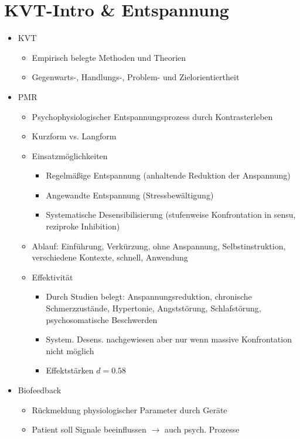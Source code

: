 \documentclass[11pt, paper=a4, twocolumn]{scrartcl}
\begin{document}
	\section{KVT-Intro \& Entspannung}
		\begin{itemize}
			\item KVT
				\begin{itemize}
					\item Empirisch belegte Methoden und Theorien
					\item Gegenwarts-, Handlungs-, Problem- und Zielorientiertheit
				\end{itemize}
			\item PMR
				\begin{itemize}
					\item Psychophysiologischer Entspannungsprozess durch Kontrasterleben
					\item Kurzform vs. Langform
					\item Einsatzmöglichkeiten
						\begin{itemize}
							\item Regelmäßige Entspannung (anhaltende Reduktion der Anspannung)
							\item Angewandte Entspannung (Stressbewältigung)
							\item Systematische Desensibilisierung (stufenweise Konfrontation in sensu, reziproke Inhibition)
						\end{itemize}
					\item Ablauf: Einführung, Verkürzung, ohne Anspannung, Selbstinstruktion, verschiedene Kontexte, schnell, 
						Anwendung
					\item Effektivität
						\begin{itemize}
							\item Durch Studien belegt: Anspannungsreduktion, chronische Schmerzzustände, Hypertonie, 
								Angststörung, Schlafstörung, psychosomatische Beschwerden
							\item System. Desens. nachgewiesen aber nur wenn massive Konfrontation nicht möglich
							\item Effektstärken $d=0.58$
						\end{itemize}
				\end{itemize}
			\item Biofeedback
				\begin{itemize}
					\item Rückmeldung physiologischer Parameter durch Geräte
					\item Patient soll Signale beeinflussen $\rightarrow$ auch psych. Prozesse

\end{itemize}
\end{itemize}
\end{document}
